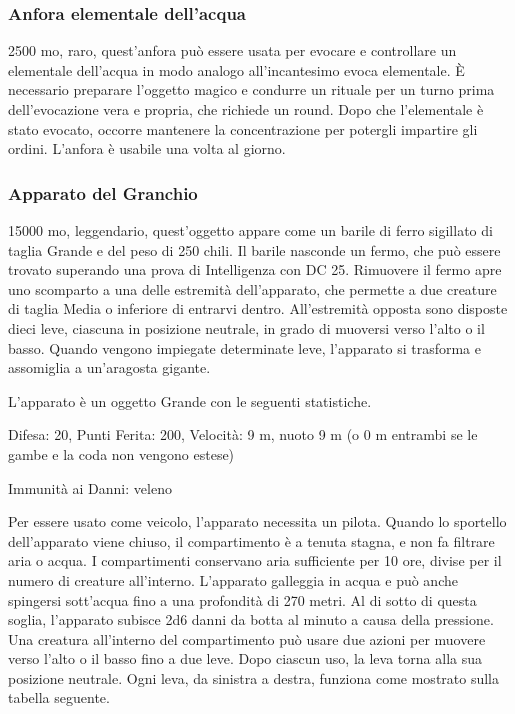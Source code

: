 \begin{multicols}{2}
\subsubsection*{Anfora elementale dell’acqua}
2500 mo, raro, quest'anfora può essere usata per evocare e controllare un elementale dell’acqua in modo analogo all’incantesimo evoca elementale. È necessario preparare l'oggetto magico e condurre un rituale per un turno prima dell’evocazione vera e propria, che richiede un round. Dopo che l’elementale è stato evocato, occorre mantenere la concentrazione per potergli impartire gli ordini. L'anfora è usabile una volta al giorno.

\subsubsection*{Apparato del Granchio}
15000 mo, leggendario, quest'oggetto appare come un barile di ferro sigillato di taglia Grande e del peso di 250 chili. Il barile nasconde un fermo, che può essere trovato superando una prova di Intelligenza con DC 25. Rimuovere il fermo apre uno scomparto a una delle estremità dell'apparato, che permette a due creature di taglia Media o inferiore di entrarvi dentro. All'estremità opposta sono disposte dieci leve, ciascuna in posizione neutrale, in grado di muoversi verso l'alto o il basso. Quando vengono impiegate determinate leve, l'apparato si trasforma e assomiglia a un'aragosta gigante.

L'apparato è un oggetto Grande con le seguenti statistiche.

Difesa: 20, Punti Ferita: 200, Velocità: 9 m, nuoto 9 m (o 0 m entrambi se le gambe e la coda non vengono estese)

Immunità ai Danni: veleno

Per essere usato come veicolo, l'apparato necessita un pilota. Quando lo sportello dell'apparato viene chiuso, il compartimento è a tenuta stagna, e non fa filtrare aria o acqua. I compartimenti conservano aria sufficiente per 10 ore, divise per il numero di creature all'interno. L'apparato galleggia in acqua e può anche spingersi sott'acqua fino a una profondità di 270 metri. Al di sotto di questa soglia, l'apparato subisce 2d6 danni da botta al minuto a causa della pressione. Una creatura all'interno del compartimento può usare due azioni per muovere verso l'alto o il basso fino a due leve. Dopo ciascun uso, la leva torna alla sua posizione neutrale. Ogni leva, da sinistra a destra, funziona come mostrato sulla tabella seguente.


\end{multicols}
